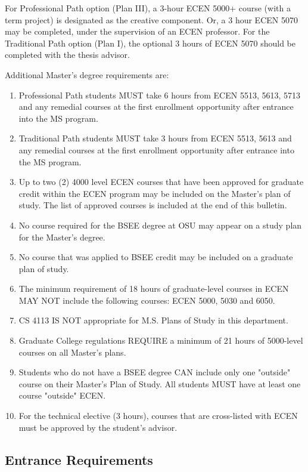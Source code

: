 For Professional Path option (Plan III), a 3-hour ECEN 5000+ course (with a term project) is designated as the creative component. Or, a 3 hour ECEN 5070 may be completed, under the supervision of an ECEN professor. For the Traditional Path option (Plan I), the optional 3 hours of ECEN 5070 should be completed with the thesis advisor.

Additional Master's degree requirements are:

\begin{enumerate}
    \item Professional Path students MUST take 6 hours from ECEN 5513, 5613, 5713 and any remedial courses at the first enrollment opportunity after entrance into the MS program.
    \item Traditional Path students MUST take 3 hours from ECEN 5513, 5613 and any remedial courses at the first enrollment opportunity after entrance into the MS program.
    \item Up to two (2) 4000 level ECEN courses that have been approved for graduate credit within the ECEN program may be included on the Master's plan of study. The list of approved courses is included at the end of this bulletin.
    \item No course required for the BSEE degree at OSU may appear on a study plan for the Master's degree.
    \item No course that was applied to BSEE credit may be included on a graduate plan of study.
    \item The minimum requirement of 18 hours of graduate-level courses in ECEN MAY NOT include the following courses: ECEN 5000, 5030 and 6050.
    \item CS 4113 IS NOT appropriate for M.S. Plans of Study in this department.
    \item Graduate College regulations REQUIRE a minimum of 21 hours of 5000-level courses on all Master's plans.
    \item Students who do not have a BSEE degree CAN include only one "outside" course on their Master's Plan of Study. All students MUST have at least one course "outside" ECEN.
    \item For the technical elective (3 hours), courses that are cross-listed with ECEN must be approved by the student's advisor.
\end{enumerate}

\subsection{Entrance Requirements}

